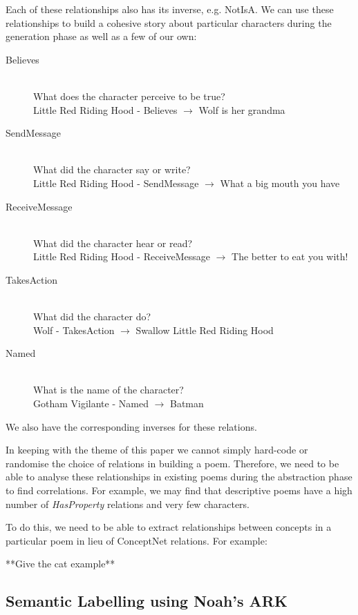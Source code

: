 Each of these relationships also has its inverse, e.g. NotIsA. We can use these relationships to build a cohesive story about particular characters during the generation phase as well as a few of our own:

\begin{description}
\item[Believes] \hfill \\ What does the character perceive to be true? \hfill \\ Little Red Riding Hood - Believes $\rightarrow$ Wolf is her grandma
\item[SendMessage] \hfill \\ What did the character say or write?  \hfill \\ Little Red Riding Hood - SendMessage $\rightarrow$ What a big mouth you have
\item[ReceiveMessage] \hfill \\ What did the character hear or read?  \hfill \\ Little Red Riding Hood - ReceiveMessage $\rightarrow$ The better to eat you with!
\item[TakesAction] \hfill \\ What did the character do?  \hfill \\ Wolf - TakesAction $\rightarrow$ Swallow Little Red Riding Hood
\item[Named] \hfill \\ What is the name of the character? \hfill \\ Gotham Vigilante - Named $\rightarrow$ Batman
\end{description}

We also have the corresponding inverses for these relations. 

In keeping with the theme of this paper we cannot simply hard-code or randomise the choice of relations in building a poem. Therefore, we need to be able to analyse these relationships in existing poems during the abstraction phase to find correlations. For example, we may find that descriptive poems have a high number of \textit{HasProperty} relations and very few characters.  

To do this, we need to be able to extract relationships between concepts in a particular poem in lieu of ConceptNet relations. For example:

**Give the cat example**

\subsection{Semantic Labelling using Noah's ARK}

